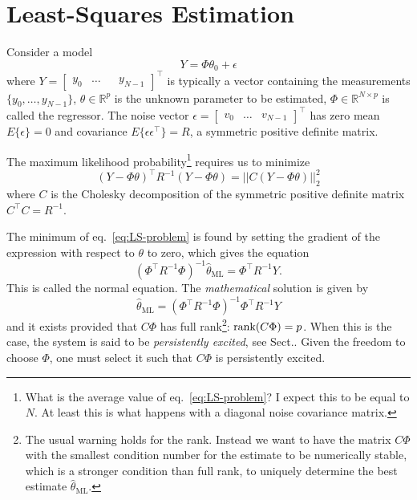 \chapter{Least-Squares Estimation}
\label{sec:LS-estimation}

Consider a model
\begin{equation}
  \label{eq:LTI-with-noise}
  Y = \Phi\theta_0 + \epsilon
\end{equation}
where $Y = \begin{bmatrix}
  y_0 & \ldots && y_{N-1}
\end{bmatrix}^\top$ is typically a vector containing the measurements $\{y_0,\ldots, y_{N-1}\}$, $\theta\in\mathbb{R}^p$ is the unknown parameter to be estimated, $\Phi\in \mathbb{R}^{N\times p}$ is called the regressor.
The noise vector $\epsilon =
\begin{bmatrix}
  v_0 & \ldots & v_{N-1}
\end{bmatrix}^\top$ has zero mean $E\{\epsilon\}=0$ and covariance $E\{\epsilon \epsilon^\top\}=R$, a symmetric positive definite matrix.

The maximum likelihood probability\footnote{What is the average value of eq.~\eqref{eq:LS-problem}?
  I expect this to be equal to $N$.
  At least this is what happens with a diagonal noise covariance matrix.} requires us to minimize
\begin{equation}
  \label{eq:LS-problem}
  (Y - \Phi \theta)^\top R^{-1} (Y - \Phi \theta) = ||C (Y - \Phi \theta)||_2^2
\end{equation}
where $C$ is the Cholesky decomposition of the symmetric positive definite matrix $C^\top C = R^{-1}$.

The minimum of eq.~\eqref{eq:LS-problem} is found by setting the gradient of the expression with respect to $\theta$ to zero, which gives the equation
\begin{equation*}
  \left(\Phi^\top R^{-1}\Phi\right)^{-1} \hat{\theta}_\text{ML} = \Phi^\top R^{-1}Y.
\end{equation*}
This is called the normal equation.
The \emph{mathematical} solution is given by
\begin{equation}
  \label{eq:LS-estimator}
  \hat{\theta}_\text{ML} = \left(\Phi^\top R^{-1}\Phi\right)^{-1} \Phi^\top R^{-1}Y
\end{equation}
and it exists provided that $C\Phi$ has full rank\footnote{The usual warning holds for the rank. Instead we want to have the matrix $C\Phi$ with the smallest condition number for the estimate to be numerically stable, which is a stronger condition than full rank, to uniquely determine the best estimate $\hat{\theta}_\text{ML}$.}: $\textrm{rank}(C\Phi) = p$. When this is the case, the system is said to be \emph{persistently excited}, see Sect.. Given the freedom to choose $\Phi$, one must select it such that $C\Phi$ is persistently excited.

